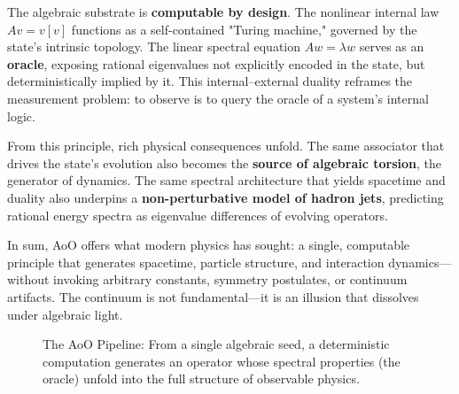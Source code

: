 \documentclass[11pt, a4paper]{article}
\theoremstyle{definition}
\theoremstyle{remark}
\begin{document}
The algebraic substrate is \textbf{computable by design}. The nonlinear internal law $Av = v[v]$ functions as a self-contained "Turing machine," governed by the state’s intrinsic topology. The linear spectral equation $Aw = \lambda w$ serves as an \textbf{oracle}, exposing rational eigenvalues not explicitly encoded in the state, but deterministically implied by it. This internal–external duality reframes the measurement problem: to observe is to query the oracle of a system’s internal logic.

From this principle, rich physical consequences unfold. The same associator that drives the state's evolution also becomes the \textbf{source of algebraic torsion}, the generator of dynamics. The same spectral architecture that yields spacetime and duality also underpins a \textbf{non-perturbative model of hadron jets}, predicting rational energy spectra as eigenvalue differences of evolving operators. 

In sum, AoO offers what modern physics has sought: a single, computable principle that generates spacetime, particle structure, and interaction dynamics—without invoking arbitrary constants, symmetry postulates, or continuum artifacts. The continuum is not fundamental—it is an illusion that dissolves under algebraic light.

\begin{figure}[h!]
\centering
{}
\caption{The AoO Pipeline: From a single algebraic seed, a deterministic computation generates an operator whose spectral properties (the oracle) unfold into the full structure of observable physics.}
\label{fig:aoo_pipeline}
\end{figure}
\end{document}
